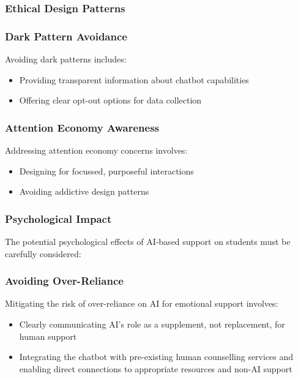 \documentclass[14pt,a4paper]{article}
\begin{document}
\begin{multicols}{2}
\subsubsection{Ethical Design Patterns}
\subsubsection{Dark Pattern Avoidance}
Avoiding dark patterns \textit{\parencite{Brignull2023}} includes:
\begin{itemize}
    \item Providing transparent information about chatbot capabilities
    \item Offering clear opt-out options for data collection
\end{itemize}


\subsubsection{Attention Economy Awareness}
Addressing attention economy concerns \textit{\parencite[pp. 10-30]{Williams2024}} involves:
\begin{itemize}
    \item Designing for focussed, purposeful interactions
    \item Avoiding addictive design patterns
\end{itemize}



\subsubsection{Psychological Impact}
The potential psychological effects of AI-based support on students must be carefully considered:

\subsubsection*{Avoiding Over-Reliance}
Mitigating the risk of over-reliance on AI for emotional support \textit{\parencite[p. 746]{Miner2022}} involves:
\begin{itemize}
    \item Clearly communicating AI's role as a supplement, not replacement, for human support
    \item Integrating the chatbot with pre-existing human counselling services and enabling direct connections to appropriate resources and non-AI support
\end{itemize}


\end{multicols}
\end{document}
